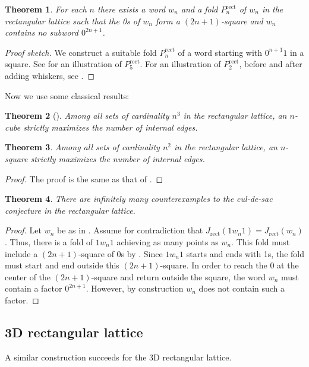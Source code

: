 \documentclass{article}
\newtheorem{theorem}{Theorem}
\begin{document}
\begin{theorem}\label{nov23-2024}
	For each $n$ there exists a word $w_n$ and a fold $P^{\mathrm{rect}}_n$ of $w_n$ in the rectangular lattice such that the 0s of $w_n$ form a $(2n+1)$-square
	and $w_n$ contains no subword $0^{2n+1}$.
\end{theorem}
\begin{proof}[Proof sketch]
	We construct a suitable fold $P_n^{\text{rect}}$ of a word starting with $0^{n+1}1$ in a square.
	See  for an illustration of $P^{\mathrm{rect}}_5$.
	For an illustration of $P_2^{\text{rect}}$, before and after adding whiskers, see .
\end{proof}
Now we use some classical results:
\begin{theorem}[{\cite[Fact 3.1]{10.1145/279069.279080}}]\label{bl3}
	Among all sets of cardinality $n^3$ in the rectangular lattice, an $n$-cube strictly maximizes the number of internal edges.
\end{theorem}
\begin{theorem}\label{bl}
	Among all sets of cardinality $n^2$ in the rectangular lattice, an $n$-square strictly maximizes the number of internal edges.
\end{theorem}
\begin{proof}
	The proof is the same as that of .
\end{proof}
\begin{theorem}\label{iso-rect}
	There are infinitely many counterexamples to the \emph{cul-de-sac} conjecture in the rectangular lattice.
\end{theorem}
\begin{proof}
	Let $w_n$ be as in .
	Assume for contradiction that $J_{\mathrm{rect}}(1w_n1)=J_{\mathrm{rect}}(w_n)$. Thus, there is a fold of $1w_n1$ achieving as many points as $w_n$.
	This fold must include a $(2n+1)$-square of 0s by .
	Since $1w_n1$ starts and ends with 1s, the fold must start and end outside this $(2n+1)$-square.
	In order to reach the 0 at the center of the $(2n+1)$-square and return outside the square, the word $w_n$ must contain a factor $0^{2n+1}$.
	However, by construction $w_n$ does not contain such a factor.
\end{proof}

\subsection{3D rectangular lattice}
A similar construction succeeds for the 3D rectangular lattice.
\end{document}

